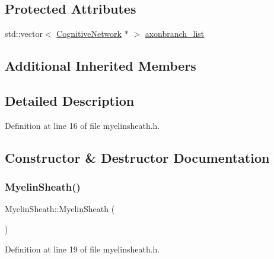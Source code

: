 \subsection*{Protected Attributes}
\begin{DoxyCompactItemize}
\item 
std\+::vector$<$ \hyperlink{class_cognitive_network}{Cognitive\+Network} $\ast$ $>$ \hyperlink{class_myelin_sheath_a7877f5feab5bae37903653bf89dc3d5b}{axonbranch\+\_\+list}
\end{DoxyCompactItemize}
\subsection*{Additional Inherited Members}


\subsection{Detailed Description}


Definition at line 16 of file myelinsheath.\+h.



\subsection{Constructor \& Destructor Documentation}
\mbox{\label{class_myelin_sheath_a298d69acb8d64de018f32443ea015287}} 
\subsubsection{\texorpdfstring{Myelin\+Sheath()}{MyelinSheath()}\hspace{0.1cm}{\footnotesize\ttfamily [1/4]}}
{\footnotesize\ttfamily Myelin\+Sheath\+::\+Myelin\+Sheath (\begin{DoxyParamCaption}{ }\end{DoxyParamCaption})\hspace{0.3cm}{\ttfamily [inline]}}



Definition at line 19 of file myelinsheath.\+h.

\mbox{\label{class_myelin_sheath_a9f9f90c853f341b5cbf4f2c5035a14af}} 
